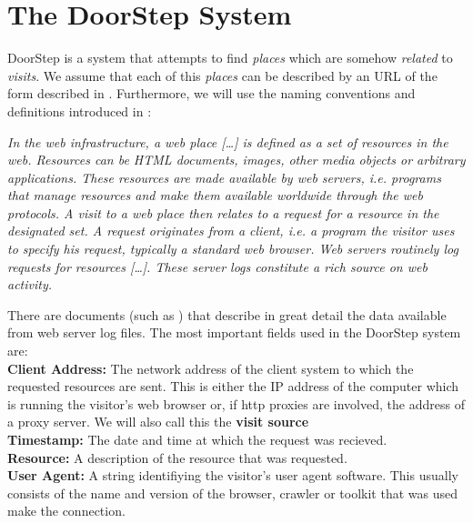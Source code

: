 \documentclass[a4paper]{danarticle}
\theoremstyle{remark}
\begin{document}
  \section{The DoorStep System}
    DoorStep is a system that attempts to find \textit{places} which are somehow
    \textit{related} to \textit{visits}. We assume that each
    of this \textit{places} can be described by an URL of the form described in
    \cite{url}. Furthermore, we will use the naming conventions and definitions
    introduced in \cite{webaware}:
    \begin{center}
    \begin{minipage}{10cm}
    \itshape
    In the web infrastructure, a web place [\dots] is defined as 
    a set of resources in the web. Resources can
    be HTML documents, images, other media objects or arbitrary applications.
    These resources are made available by web servers, i.e. programs that manage
    resources and make them available worldwide through the web protocols. A
    visit to a web place then relates to a request for a resource in the
    designated set. A request originates from a client, i.e. a program the
    visitor uses to specify his request, typically a standard web browser. Web
    servers routinely log requests for resources [\dots]. These server logs
    constitute a rich source on web activity.
    \end{minipage}
    \end{center}
    There are documents (such as \cite{logfile}) that describe in great detail 
    the data available from web server log files. The most important fields used 
    in the DoorStep system are:
    \\
    
    \textbf{Client Address:} The network address of the client system to which 
    the requested resources are sent. This is either the IP address of the 
    computer which is running the visitor's web browser or, if http proxies are 
    involved, the address of a proxy server. We will also call this the 
    \textbf{visit source}
    \\
    
    \textbf{Timestamp:} The date and time at which the request was recieved.
    \\
    
    \textbf{Resource:} A description of the resource that was requested.
    \\
    
    \textbf{User Agent:} A string identifiying the visitor's user agent 
    software. This usually consists of the name and version of the browser, 
    crawler or toolkit that was used make the connection.
    \\
    
\end{document}
